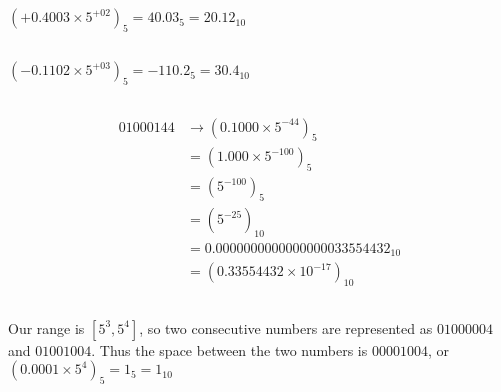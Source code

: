 \documentclass[11pt]{article}
\begin{document}
\renewcommand{\thesubsection}{\thesection.\alph{subsection}}


\section{} %
\subsection{} %
$(+0.4003\times5^{+02})_5=40.03_5=20.12_{10}$


\subsection{} %
$(-0.1102\times5^{+03})_5=-110.2_5=30.4_{10}$


\subsection{} %
\begin{align*}
	01000144&\rightarrow(0.1000\times5^{-44})_5\\
	&=(1.000\times5^{-100})_5\\
	&=(5^{-100})_5\\
	&=(5^{-25})_{10}\\
	&=0.0000000000000000033554432_{10}\\
	&=(0.33554432\times10^{-17})_{10}
\end{align*}


\subsection{} %
Our range is $[5^3,5^4]$, so two consecutive numbers are represented as
$01000004$ and $01001004$. Thus the space between the two numbers is
$00001004$, or $(0.0001\times5^4)_5=1_5=1_{10}$


\section{} %
\end{document}
